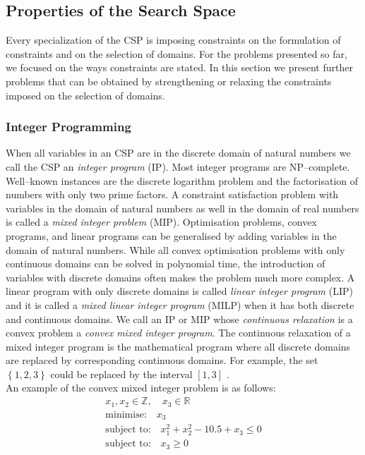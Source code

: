 \subsection{Properties of the Search Space}
Every specialization of the CSP is imposing constraints on the formulation of constraints and on the selection of domains. For the problems presented so far, we focused on the ways constraints are stated. In this section we present further problems that can be obtained by strengthening or relaxing the constraints imposed on the selection of domains.
\subsubsection{Integer Programming}
When all variables in an CSP are in the discrete domain of natural numbers we call the CSP an \emph{integer program} (IP). Most integer programs are NP--complete. Well--known instances are the discrete logarithm problem and the factorisation of numbers with only two prime factors. A constraint satisfaction problem with variables in the domain of natural numbers as well in the domain of real numbers is called a \emph{mixed integer problem} (MIP). Optimisation problems, convex programs, and linear programs can be generalised by adding variables in the domain of natural numbers. While all convex optimisation problems with only continuous domains can be solved in polynomial time, the introduction of variables with discrete domains often makes the problem much more complex. A linear program with only discrete domains is called \emph{linear integer program} (LIP) and it is called a \emph{mixed linear integer program} (MILP) when it has both discrete and continuous domains. We call an IP or MIP whose \emph{continuous relaxation} is a convex problem a \emph{convex mixed integer program}. The continuous relaxation of a mixed integer program is the mathematical program where all discrete domains are replaced by corresponding continuous domains. For example, the set 
$\left\lbrace 1,2,3 \right\rbrace $
 could be replaced by the interval 
 $\left[ 1,3 \right] $
 .\\
An example of the convex mixed integer problem is as follows:
\begin{eqnarray}
x_1,x_2\in \mathbb{Z},\quad x_3\in \mathbb{R}\\
\text{minimise:}\quad x_3 \\
\text{subject to:}\quad x_1^2 + x_2^2 - 10.5 + x_3 \leq 0 \\
\text{subject to:}\quad x_3 \geq 0
\end{eqnarray}
